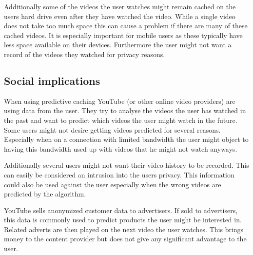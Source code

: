 Additionally some of the videos the user watches might remain cached on the users hard drive even after they have watched the video. While a single video does not take too much space this can cause a problem if there are many of these cached videos. It is especially important for mobile users as these typically have less space available on their devices. Furthermore the user might not want a record of the videos they watched for privacy reasons.

\subsection{Social implications}
When using predictive caching YouTube (or other online video providers) are using data from the user. They try to analyse the videos the user has watched in the past and want to predict which videos the user might watch in the future. Some users might not desire getting videos predicted for several reasons. Especially when on a connection with limited bandwidth the user might object to having this bandwidth used up with videos that he might not watch anyways.

Additionally several users might not want their video history to be recorded. This can easily be considered an intrusion into the users privacy. This information could also be used against the user especially when the wrong videos are predicted by the algorithm.

YouTube sells anonymized customer data to advertisers. If sold to advertisers, this data is commonly used to predict products the user might be interested in. Related adverts are then played on the next video the user watches. This brings money to the content provider but does not give any significant advantage to the user.

